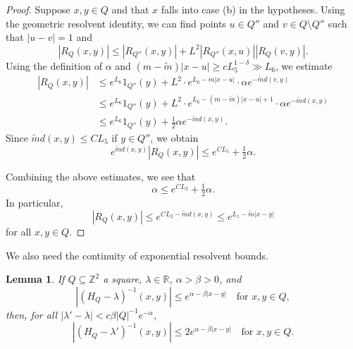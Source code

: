\documentclass{amsart}
\newtheorem{lemma}[equation]{Lemma}
\numberwithin{equation}{section}
\numberwithin{figure}{section}
\newcommand{\Z}{\mathbb{Z}}
\newcommand{\R}{\mathbb{R}}
\newcommand{\id}{1}
\begin{document}
\begin{proof}
Suppose $x, y \in Q$ and that $x$ falls into case (b) in the hypotheses.  Using the geometric resolvent identity, we can find points $u \in Q''$ and $v \in Q \setminus Q''$ such that $|u - v| = 1$ and
\begin{equation*}
|R_Q(x,y)| \leq |R_{Q''}(x,y)| + L^2 |R_{Q''}(x,u)| |R_Q(v,y)| .
\end{equation*}
Using the definition of $\alpha$ and $(m-\tilde m) |x - u| \geq c L_5^{1-\delta} \gg L_6$, we estimate
\begin{equation*}
\begin{aligned}
|R_Q(x,y)|
& \leq e^{L_6} \id_{Q''}(y) + L^2 \cdot e^{L_6 - m |x-u|} \cdot \alpha e^{-\tilde m d(v,y)} \\
& \leq e^{L_6} \id_{Q''}(y) + L^2 \cdot e^{L_6 - (m - \tilde m)|x-u| + 1} \cdot \alpha e^{-\tilde m d(x,y)} \\
& \leq e^{L_6} \id_{Q''}(y) + \tfrac12 \alpha e^{-\tilde m d(x,y)}.
\end{aligned}
\end{equation*}
Since $\tilde m d(x,y) \leq C L_5$ if $y \in Q''$, we obtain
\begin{equation*}
e^{\tilde m d(x,y)} |R_Q(x,y)| \leq e^{C L_5} + \tfrac12 \alpha.
\end{equation*}

Combining the above estimates, we see that
\begin{equation*}
\alpha \leq e^{C L_2} + \tfrac12 \alpha.
\end{equation*}
In particular,
\begin{equation*}
|R_Q(x,y)| \leq e^{C L_2 - \tilde m d(x,y)} \leq e^{L_1 - \tilde m |x - y|}
\end{equation*}
for all $x, y \in Q$.
\end{proof}

We also need the continuity of exponential resolvent bounds.

\begin{lemma}
\label{l.continuity}
If $Q \subseteq \Z^2$ a square, $\lambda \in \R$, $\alpha > \beta > 0$, and
\begin{equation*}
|(H_Q - \lambda)^{-1}(x,y)| \leq e^{\alpha - \beta |x-y|} \quad \mbox{for } x, y \in Q,
\end{equation*}
then, for all $|\lambda' - \lambda| < c \beta |Q|^{-1} e^{-\alpha}$,
\begin{equation*}
|(H_Q - \lambda')^{-1}(x,y)| \leq 2 e^{\alpha - \beta |x-y|} \quad \mbox{for } x, y \in Q.
\end{equation*}
\end{lemma}
\end{document}
